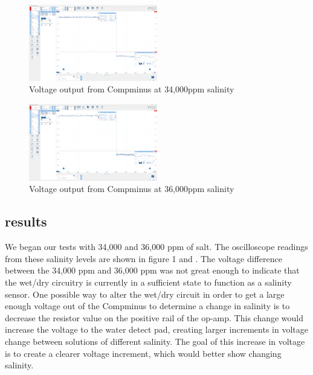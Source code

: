 \documentclass[twocolumn]{report}
\begin{document}
\begin{figure}
    \centering
    \includegraphics[width=0.5\textwidth]{34,000ppmsalinity.png}
    \caption{Voltage output from Compminus at 34,000ppm salinity}
    \label{fig:enter-label}
\end{figure}

\begin{figure}
    \centering
    \includegraphics[width=0.5\textwidth]{36,000ppmsalinity.png}
    \caption{Voltage output from Compminus at 36,000ppm salinity}
    \label{fig:enter-label}
\end{figure}

\subsection{results}
We began our tests with 34,000 and 36,000 ppm of salt. The oscilloscope readings from these salinity levels are shown in figure 1 and . The voltage difference between the 34,000 ppm and 36,000 ppm was not great enough to indicate that the wet/dry circuitry is currently in a sufficient state to function as a salinity sensor. One possible way to alter the wet/dry circuit in order to get a large enough voltage out of the Compminus to determine a change in salinity is to decrease the resistor value on the positive rail of the op-amp. This change would increase the voltage to the water detect pad, creating larger increments in voltage change between solutions of different salinity. The goal of this increase in voltage is to create a clearer voltage increment, which would better show changing salinity.
\end{document}
